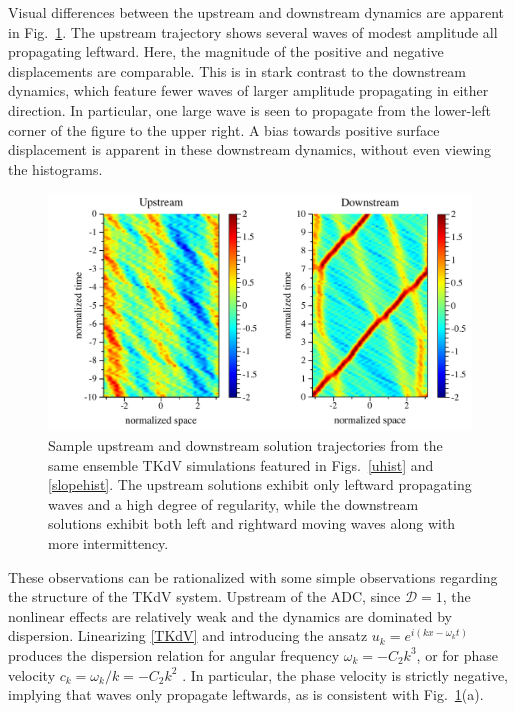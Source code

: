 \documentclass[11pt]{article}
\newcommand{\drat}{\mathcal{D}}
\begin{document}
	Visual differences between the upstream and downstream dynamics are apparent in Fig.~\ref{trajectories}. The upstream trajectory shows several waves of modest amplitude all propagating leftward. Here, the magnitude of the positive and negative displacements are comparable. This is in stark contrast to the downstream dynamics, which feature fewer waves of larger amplitude propagating in either direction. In particular, one large wave is seen to propagate from the lower-left corner of the figure to the upper right. A bias towards positive surface displacement is apparent in these downstream dynamics, without even viewing the histograms.

\begin{figure}%
\begin{center}
\includegraphics[width = 0.9 \linewidth]{Figs/trajectories.pdf}
\caption{
Sample upstream and downstream solution trajectories from the same ensemble TKdV simulations featured in Figs.~\ref{uhist} and \ref{slopehist}. The upstream solutions exhibit only leftward propagating waves and a high degree of regularity, while the downstream solutions exhibit both left and rightward moving waves along with more intermittency.
}
\label{trajectories}
\end{center}
\end{figure}

These observations can be rationalized with some simple observations regarding the structure of the TKdV system. Upstream of the ADC, since $\drat = 1$, the nonlinear effects are relatively weak and the dynamics are dominated by dispersion. Linearizing \eqref{TKdV} and introducing the ansatz $u_k = e^{i(kx - \omega_k t)}$ produces the dispersion relation for angular frequency $\omega_k = -C_2 k^3$, or for phase velocity $c_k = \omega_k/k = -C_2 k^2$ \cite{majdaqi2019}. In particular, the phase velocity is strictly negative, implying that waves only propagate leftwards, as is consistent with Fig.~\ref{trajectories}(a).
\end{document}
